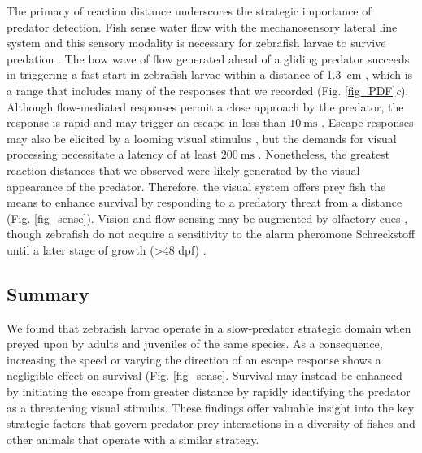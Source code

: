 \documentclass[]{rsos}%
\begin{document}
The primacy of reaction distance underscores the strategic importance of predator detection. 
Fish sense water flow with the mechanosensory lateral line system and this sensory modality is necessary for zebrafish larvae to survive predation \cite{Stewart:2013bha}.
The bow wave of flow generated ahead of a gliding predator succeeds in triggering a fast start in zebrafish larvae within a distance of \SI{1.3}{\cm} \cite{Stewart:2014cma}, which is a range that includes many of the responses that we recorded (Fig. \ref{fig_PDF}\textit{c}).
Although flow-mediated responses permit a close approach by the predator, the response is rapid and may trigger an escape in less than $\SI{10}{\ms}$  \cite{Liu:1999fs}. 
Escape responses may also be elicited by a looming visual stimulus \cite{Bianco:2011ca}, but the demands for visual processing necessitate a latency of at least $\SI{200}{\ms}$ \cite{Burgess:2007vp}. 
Nonetheless, the greatest reaction distances that we observed were likely generated by the visual appearance of the predator.
Therefore, the visual system offers prey fish the means to enhance survival by responding to a predatory threat from a distance (Fig. \ref{fig_sense}).
Vision and flow-sensing may be augmented by olfactory cues \cite{Waldman:1982ic}, though zebrafish do not acquire a sensitivity to the alarm pheromone Schreckstoff until a later stage of growth (>48 dpf) \cite{Waldman:1982ic}.


\subsection*{Summary} 

We found that zebrafish larvae operate in a slow-predator strategic domain when preyed upon by adults and juveniles of the same species.
As a consequence, increasing the speed or varying the direction of an escape response shows a negligible effect on survival (Fig. \ref{fig_sense}.
Survival may instead be enhanced by initiating the escape from greater distance by rapidly identifying the predator as a threatening visual stimulus.  
These findings offer valuable insight into the key strategic factors that govern predator-prey interactions in a diversity of fishes and other animals that operate with a similar strategy. 



\end{document}
